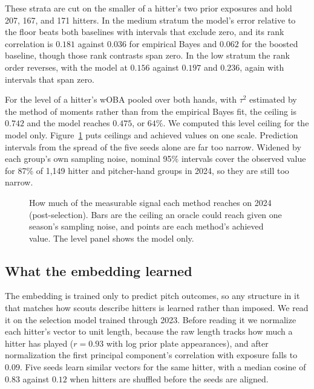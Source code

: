 \documentclass[11pt,letterpaper]{article}
\begin{document}
These strata are cut on the smaller of a hitter's two prior exposures and hold 207, 167, and 171 hitters. In the medium stratum the model's error relative to the floor beats both baselines with intervals that exclude zero, and its rank correlation is $0.181$ against $0.036$ for empirical Bayes and $0.062$ for the boosted baseline, though those rank contrasts span zero. In the low stratum the rank order reverses, with the model at $0.156$ against $0.197$ and $0.236$, again with intervals that span zero.

For the level of a hitter's wOBA pooled over both hands, with $\tau^2$ estimated by the method of moments rather than from the empirical Bayes fit, the ceiling is $0.742$ and the model reaches $0.475$, or $64\%$. We computed this level ceiling for the model only. Figure~\ref{fig:ceiling} puts ceilings and achieved values on one scale. Prediction intervals from the spread of the five seeds alone are far too narrow. Widened by each group's own sampling noise, nominal 95\% intervals cover the observed value for 87\% of 1,149 hitter and pitcher-hand groups in 2024, so they are still too narrow.

\begin{figure}[t]
\centering
{}
\caption{How much of the measurable signal each method reaches on 2024 (post-selection). Bars are the ceiling an oracle could reach given one season's sampling noise, and points are each method's achieved value. The level panel shows the model only.}
\label{fig:ceiling}
\end{figure}

\subsection{What the embedding learned}
\label{sec:embedding}

The embedding is trained only to predict pitch outcomes, so any structure in it that matches how scouts describe hitters is learned rather than imposed. We read it on the selection model trained through 2023. Before reading it we normalize each hitter's vector to unit length, because the raw length tracks how much a hitter has played ($r = 0.93$ with log prior plate appearances), and after normalization the first principal component's correlation with exposure falls to $0.09$. Five seeds learn similar vectors for the same hitter, with a median cosine of $0.83$ against $0.12$ when hitters are shuffled before the seeds are aligned.
\end{document}
